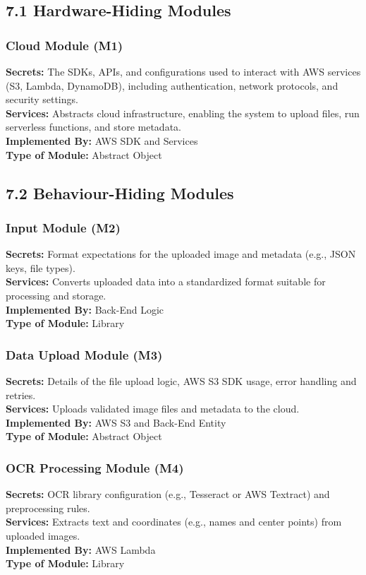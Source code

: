 \documentclass[12pt, titlepage]{article}
\begin{document}
\subsection{7.1 Hardware-Hiding Modules}

\subsubsection{ Cloud Module (M1)}
\textbf{Secrets:} The SDKs, APIs, and configurations used to interact with AWS services (S3, Lambda, DynamoDB), including authentication, network protocols, and security settings. \\
\textbf{Services:} Abstracts cloud infrastructure, enabling the system to upload files, run serverless functions, and store metadata. \\
\textbf{Implemented By:} AWS SDK and Services \\
\textbf{Type of Module:} Abstract Object

\subsection{7.2 Behaviour-Hiding Modules}

\subsubsection{Input Module (M2)}
\textbf{Secrets:} Format expectations for the uploaded image and metadata (e.g., JSON keys, file types). \\
\textbf{Services:} Converts uploaded data into a standardized format suitable for processing and storage. \\
\textbf{Implemented By:} Back-End Logic \\
\textbf{Type of Module:} Library

\subsubsection{Data Upload Module (M3)}
\textbf{Secrets:} Details of the file upload logic, AWS S3 SDK usage, error handling and retries. \\
\textbf{Services:} Uploads validated image files and metadata to the cloud. \\
\textbf{Implemented By:} AWS S3 and Back-End Entity \\
\textbf{Type of Module:} Abstract Object

\subsubsection{OCR Processing Module (M4)}
\textbf{Secrets:} OCR library configuration (e.g., Tesseract or AWS Textract) and preprocessing rules. \\
\textbf{Services:} Extracts text and coordinates (e.g., names and center points) from uploaded images. \\
\textbf{Implemented By:} AWS Lambda \\
\textbf{Type of Module:} Library
\end{document}
